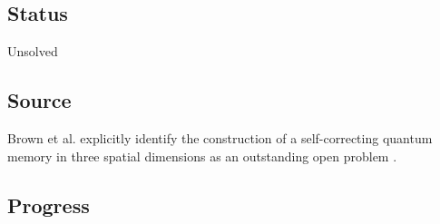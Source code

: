 \subsection*{Status}

Unsolved

\subsection*{Source}

Brown et al. explicitly identify the construction of a self-correcting
quantum memory in three spatial dimensions as an outstanding open problem
.

\subsection*{Progress}

